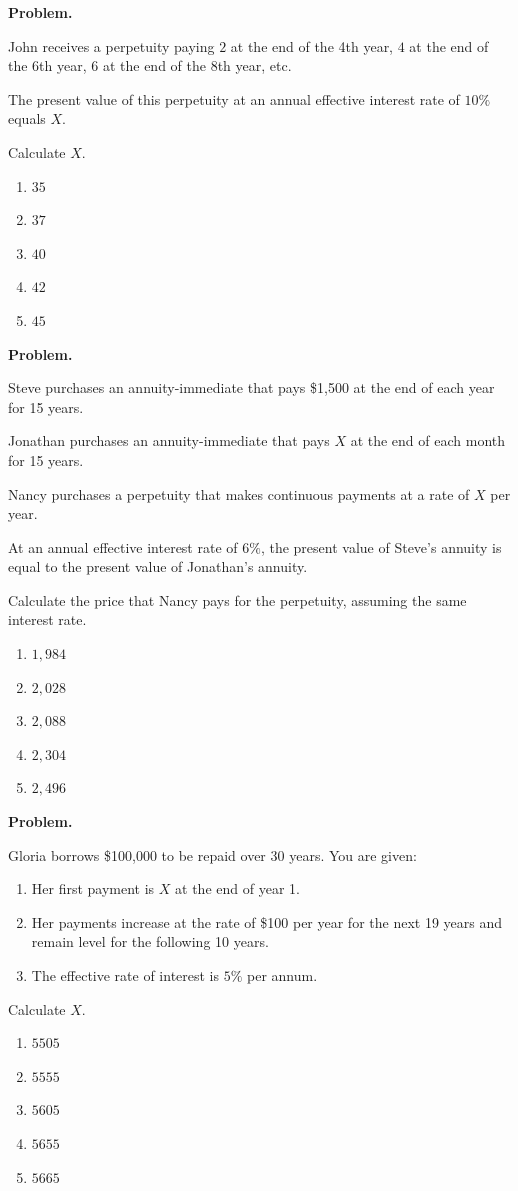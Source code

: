 \documentclass[11pt]{article}
\begin{document}
\newpage


\textbf{Problem.}

John receives a perpetuity paying $2$ at the end of the 4th year, $4$ at the end of the 6th year, $6$ at the end of the 8th year, etc.

The present value of this perpetuity at an annual effective interest rate of $10\%$ equals $X$.

Calculate $X$.

\begin{enumerate}[label=\Alph*.]
    \item $35$
    \item $37$
    \item $40$
    \item $42$
    \item $45$
\end{enumerate}

\newpage

\textbf{Problem.}

Steve purchases an annuity-immediate that pays \$1{,}500 at the end of each year for 15 years.

Jonathan purchases an annuity-immediate that pays $X$ at the end of each month for 15 years.

Nancy purchases a perpetuity that makes continuous payments at a rate of $X$ per year.

At an annual effective interest rate of $6\%$, the present value of Steve's annuity is equal to the present value of Jonathan's annuity.

Calculate the price that Nancy pays for the perpetuity, assuming the same interest rate.

\begin{enumerate}[label=\Alph*.]
    \item $1{,}984$
    \item $2{,}028$
    \item $2{,}088$
    \item $2{,}304$
    \item $2{,}496$ %
\end{enumerate}


\newpage


\textbf{Problem.}

Gloria borrows \$100{,}000 to be repaid over 30 years. You are given:

\begin{enumerate}[label=\roman*.]
    \item Her first payment is $X$ at the end of year 1.
    \item Her payments increase at the rate of \$100 per year for the next 19 years and remain level for the following 10 years.
    \item The effective rate of interest is $5\%$ per annum.
\end{enumerate}

Calculate $X$.

\begin{enumerate}[label=\Alph*.]
    \item $5505$
    \item $5555$
    \item $5605$
    \item $5655$
    \item $5665$
\end{enumerate}
\end{document}

